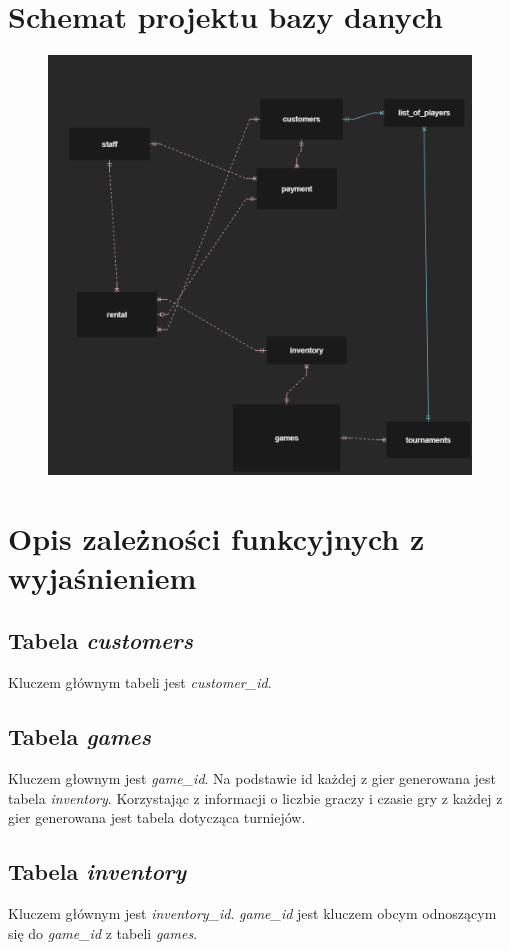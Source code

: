 \documentclass[12pt,a4paper]{article}
\begin{document}
\section{Schemat projektu bazy danych}
\begin{figure}[H]
\centering
\includegraphics[width=150mm]{schemat.png}
\end{figure}

\section{Opis zależności funkcyjnych z wyjaśnieniem}
\subsection{Tabela \textit{customers}}
Kluczem głównym tabeli jest \textit{customer\_id}.

\subsection{Tabela \textit{games}}
Kluczem głownym jest \textit{game\_id}.
Na podstawie id każdej z gier generowana jest tabela \textit{inventory}.
Korzystając z informacji o liczbie graczy i czasie gry z każdej z gier generowana jest tabela dotycząca turniejów.

\subsection{Tabela \textit{inventory}}
Kluczem głównym jest \textit{inventory\_id}. \textit{game\_id} jest kluczem obcym odnoszącym się do \textit{game\_id} z tabeli \textit{games}.
\end{document}
